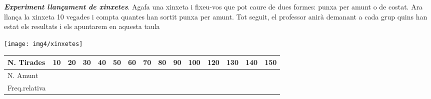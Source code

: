 \begin{mylist}

\pagebreak
 
 \mbox{}
\vspace*{-2.5cm}
\exer \simbolsearch \begin{minipage}[t]{0.7\textwidth}  \textit{\bf Experiment llançament de xinxetes}. Agafa una xinxeta i fixeu-vos que pot caure de dues formes: punxa per amunt o de costat. Ara llança la xinxeta 10 vegades i compta quantes han sortit punxa per amunt. Tot seguit, el professor anirà demanant a cada grup quins han estat els resultats i els apuntarem en aquesta taula
	\end{minipage}
\begin{minipage}{0.3\textwidth}
\vspace{2cm}
\centering
\texttt{[image: img4/xinxetes]}
\end{minipage}

\begin{longtable}{|p{0.7in}|p{0.2in}|p{0.2in}|p{0.2in}|p{0.2in}|p{0.2in}|p{0.2in}|p{0.2in}|p{0.2in}|p{0.2in}|p{0.2in}|p{0.2in}|p{0.2in}|p{0.2in}|p{0.2in}|} \hline 
	N. Tirades & 10 & 20 & 30 & 40 & 50 & 60 & 70 & 80 & 90 & 100 & 120 & 130 & 140 & 150 \\ \hline 
	N. Amunt &  &  &  &  &  &  &  &  &  &  &  &  &  &  \\ \hline 
	Freq.\newline relativa &  &  &  &  &  &  &  &  &  &  &  &  &  &  \\ \hline 
\end{longtable}


\end{mylist}

